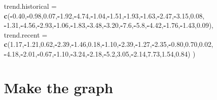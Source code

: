 \documentclass[]{article}
\newenvironment{Shaded}{\begin{snugshade}}{\end{snugshade}}
\newcommand{\KeywordTok}[1]{\textcolor[rgb]{0.13,0.29,0.53}{\textbf{#1}}}
\newcommand{\DataTypeTok}[1]{\textcolor[rgb]{0.13,0.29,0.53}{#1}}
\newcommand{\FloatTok}[1]{\textcolor[rgb]{0.00,0.00,0.81}{#1}}
\newcommand{\OperatorTok}[1]{\textcolor[rgb]{0.81,0.36,0.00}{\textbf{#1}}}
\newcommand{\NormalTok}[1]{#1}
\begin{document}
\begin{Shaded}
\begin{Highlighting}[]
\DataTypeTok{trend.historical =} \KeywordTok{c}\NormalTok{(}\OperatorTok{-}\FloatTok{0.40}\NormalTok{,}\OperatorTok{-}\FloatTok{0.98}\NormalTok{,}\FloatTok{0.07}\NormalTok{,}\OperatorTok{-}\FloatTok{1.92}\NormalTok{,}\OperatorTok{-}\FloatTok{4.74}\NormalTok{,}\OperatorTok{-}\FloatTok{1.04}\NormalTok{,}\OperatorTok{-}\FloatTok{1.51}\NormalTok{,}\OperatorTok{-}\FloatTok{1.93}\NormalTok{,}\OperatorTok{-}\FloatTok{1.63}\NormalTok{,}\OperatorTok{-}\FloatTok{2.47}\NormalTok{,}\OperatorTok{-}\FloatTok{3.15}\NormalTok{,}\FloatTok{0.08}\NormalTok{,}
                         \OperatorTok{-}\FloatTok{1.31}\NormalTok{,}\OperatorTok{-}\FloatTok{4.56}\NormalTok{,}\OperatorTok{-}\FloatTok{2.93}\NormalTok{,}\OperatorTok{-}\FloatTok{1.06}\NormalTok{,}\OperatorTok{-}\FloatTok{1.83}\NormalTok{,}\OperatorTok{-}\FloatTok{3.48}\NormalTok{,}\OperatorTok{-}\FloatTok{3.20}\NormalTok{,}\OperatorTok{-}\FloatTok{7.6}\NormalTok{,}\OperatorTok{-}\FloatTok{5.8}\NormalTok{,}\OperatorTok{-}\FloatTok{4.42}\NormalTok{,}\OperatorTok{-}\FloatTok{1.76}\NormalTok{,}\OperatorTok{-}\FloatTok{1.43}\NormalTok{,}\FloatTok{0.09}\NormalTok{),}
\DataTypeTok{trend.recent =} \KeywordTok{c}\NormalTok{(}\FloatTok{1.17}\NormalTok{,}\OperatorTok{-}\FloatTok{1.21}\NormalTok{,}\FloatTok{0.62}\NormalTok{,}\OperatorTok{-}\FloatTok{2.39}\NormalTok{,}\OperatorTok{-}\FloatTok{1.46}\NormalTok{,}\FloatTok{0.18}\NormalTok{,}\OperatorTok{-}\FloatTok{1.10}\NormalTok{,}\OperatorTok{-}\FloatTok{2.39}\NormalTok{,}\OperatorTok{-}\FloatTok{1.27}\NormalTok{,}\OperatorTok{-}\FloatTok{2.35}\NormalTok{,}\OperatorTok{-}\FloatTok{0.80}\NormalTok{,}\FloatTok{0.70}\NormalTok{,}\FloatTok{0.02}\NormalTok{,}
                         \OperatorTok{-}\FloatTok{4.18}\NormalTok{,}\OperatorTok{-}\FloatTok{2.01}\NormalTok{,}\OperatorTok{-}\FloatTok{0.67}\NormalTok{,}\OperatorTok{-}\FloatTok{1.10}\NormalTok{,}\OperatorTok{-}\FloatTok{3.24}\NormalTok{,}\OperatorTok{-}\FloatTok{2.18}\NormalTok{,}\OperatorTok{-}\FloatTok{5.2}\NormalTok{,}\FloatTok{3.05}\NormalTok{,}\OperatorTok{-}\FloatTok{2.14}\NormalTok{,}\FloatTok{7.73}\NormalTok{,}\FloatTok{1.54}\NormalTok{,}\FloatTok{0.84}\NormalTok{)}
\NormalTok{)}
\end{Highlighting}
\end{Shaded}

\section{Make the graph}\label{make-the-graph}
\end{document}
